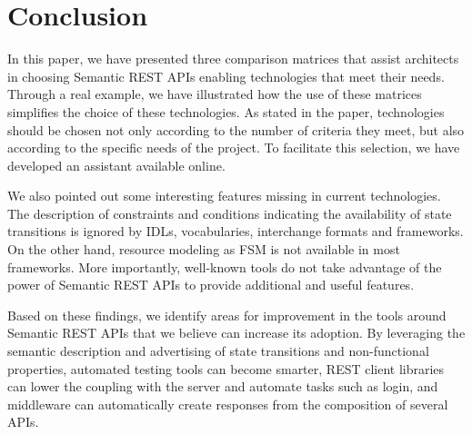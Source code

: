 \vspace*{-0.2cm}


\section{Conclusion}

\vspace*{-0.2cm}

In this paper, we have presented three comparison matrices that assist architects in choosing Semantic REST APIs enabling technologies that meet their needs.
Through a real example, we have illustrated how the use of these matrices simplifies the choice of these technologies. 
As stated in the paper, technologies should be chosen not only according to the number of criteria they meet, but also according to the specific needs of the project. 
To facilitate this selection, we have developed an assistant available online.

We also pointed out some interesting features missing in current technologies.
The description of constraints and conditions indicating the availability of state transitions is ignored by IDLs, vocabularies, interchange formats and frameworks. On the other hand, resource modeling as FSM is not available in most frameworks.
More importantly, well-known tools do not take advantage of the power of Semantic REST APIs to provide additional and useful features.

Based on these findings, we identify areas for improvement in the tools around Semantic REST APIs that we believe can increase its adoption. By leveraging the semantic description and advertising of state transitions and non-functional properties, automated testing tools can become smarter, REST client libraries can lower the coupling with the server and automate tasks such as login, and middleware can automatically create responses from the composition of several APIs.